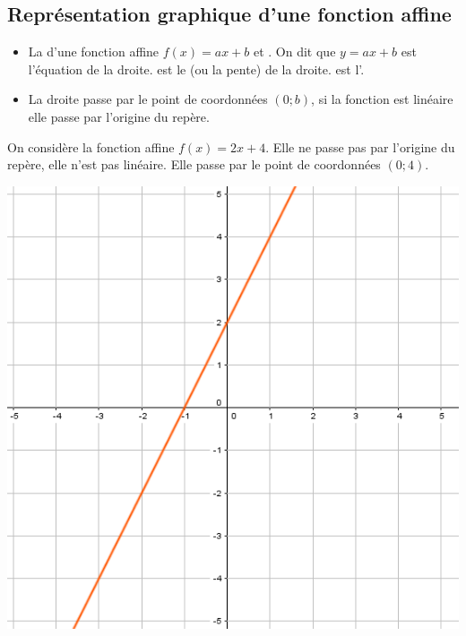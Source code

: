 \documentclass[12pt,a4paper]{article}
\begin{document}
\subsection{Représentation graphique d'une fonction affine}	

\begin{myprops}
	\begin{itemize}
		\item La  d'une fonction affine $f(x)=ax+b$ et . On dit que $y=ax+b$ est l'équation de la droite.
		 est le  (ou la pente) de la droite.
		 est l'.
		\item La droite passe par le point de coordonnées $(0;b)$, si la fonction est linéaire elle passe par l'origine du repère.
	\end{itemize}
	
\end{myprops}

\begin{myex}
	\begin{multicols}{2}
		\vspace*{1.5cm}
		On considère la fonction affine $f(x)=2x+4$. Elle ne passe pas par l'origine du repère, elle n'est pas linéaire. Elle passe par le point de coordonnées $(0;4)$.
		
		\includegraphics[scale=0.5]{ex1}
	\end{multicols}
\end{myex}
\end{document}
